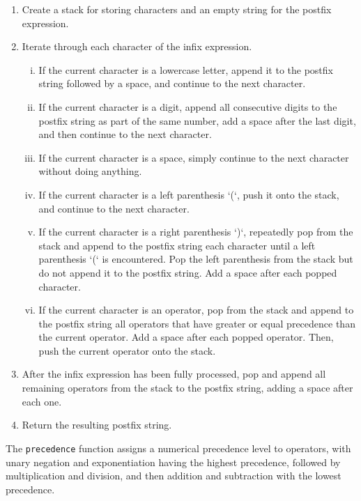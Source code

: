\documentclass{report}
\begin{document}
\begin{enumerate}
    \item Create a stack for storing characters and an empty string for the postfix expression.
    
    \item Iterate through each character of the infix expression.
    
    \begin{enumerate}[i.]
        \item If the current character is a lowercase letter, append it to the postfix string followed by a space, and continue to the next character.
        
        \item If the current character is a digit, append all consecutive digits to the postfix string as part of the same number, add a space after the last digit, and then continue to the next character.
        
        \item If the current character is a space, simply continue to the next character without doing anything.
        
        \item If the current character is a left parenthesis `(`, push it onto the stack, and continue to the next character.
        
        \item If the current character is a right parenthesis `)`, repeatedly pop from the stack and append to the postfix string each character until a left parenthesis `(` is encountered. Pop the left parenthesis from the stack but do not append it to the postfix string. Add a space after each popped character.
        
        \item If the current character is an operator, pop from the stack and append to the postfix string all operators that have greater or equal precedence than the current operator. Add a space after each popped operator. Then, push the current operator onto the stack.
    \end{enumerate}
    
    \item After the infix expression has been fully processed, pop and append all remaining operators from the stack to the postfix string, adding a space after each one.
    
    \item Return the resulting postfix string.
\end{enumerate}
\bigbreak \noindent 
The \texttt{precedence} function assigns a numerical precedence level to operators, with unary negation and exponentiation having the highest precedence, followed by multiplication and division, and then addition and subtraction with the lowest precedence.
    \bigbreak \noindent 
\end{document}
